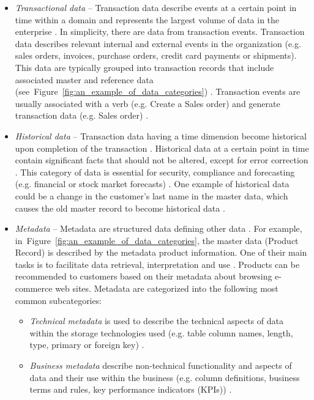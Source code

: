 \begin{itemize}
					\item \textit{Transactional data} -- Transaction data describe events at a certain point in time within a domain and represents the largest volume of data in the enterprise \cite{Mahanti2018}\cite{McGilvray2008}. In simplicity, there are data from transaction events. Transaction data describes relevant internal and external events in the organization \cite{McGilvray2008} (e.g. sales orders, invoices, purchase orders, credit card payments or shipments). This data are typically grouped into transaction records that include associated master and reference data (see~Figure~\ref{fig:an_example_of_data_categories}) \cite{McGilvray2008}. Transaction events are usually associated with a verb (e.g. Create a Sales order) and generate transaction data (e.g. Sales order) \cite{Mahanti2018}.
					\item \textit{Historical data} -- Transaction data having a time dimension become historical upon completion of the transaction \cite{Mahanti2018}. Historical data at a certain point in time contain significant facts that should not be altered, except for error correction \cite{McGilvray2008}\cite{Mahanti2018}. This category of data is essential for security, compliance and forecasting (e.g. financial or stock market forecasts) \cite{McGilvray2008}. One example of historical data could be a change in the customer's last name in the master data, which causes the old master record to become historical data \cite{Mahanti2018}.
					\item \textit{Metadata} -- Metadata are structured data defining other data \cite{Mahanti2018}. For example, in~Figure~\ref{fig:an_example_of_data_categories}, the master data (Product Record) is described by the metadata product information. One of their main tasks is to facilitate data retrieval, interpretation and use \cite{McGilvray2008}. Products can be recommended to customers based on their metadata about browsing e-commerce web sites. Metadata are categorized into the following most common subcategories:
					\begin{itemize}
						\item \emph{Technical metadata} is used to describe the technical aspects of data within the storage technologies used (e.g. table column names, length, type, primary or foreign key) \cite{McGilvray2008}\cite{Mahanti2018}.
						\item \emph{Business metadata} describe non-technical functionality and aspects of data and their use within the business (e.g. column definitions, business terms and rules, key performance indicators (KPIs)) \cite{McGilvray2008}\cite{Mahanti2018}.

\end{itemize}
\end{itemize}
